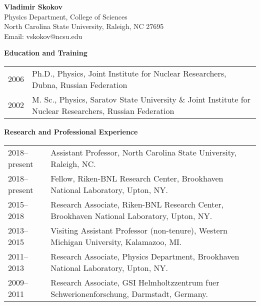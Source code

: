 
\begin{center}
   {\large\bf Vladimir Skokov} \\[0.25em]
    Physics Department, College of Sciences \\
    North Carolina State University, Raleigh, NC 27695 \\
    Email: vskokov@ncsu.edu
\end{center}

\noindent\textbf{Education and Training}

\vspace{0.6em}
\begin{tabular}{rp{5.6in}}
	2006 & Ph.D., Physics, Joint Institute for Nuclear Researchers, Dubna, Russian Federation \\[0.5em]
	2002 & M. Sc., Physics, Saratov State University \& Joint Institute for Nuclear Researchers, Russian Federation \\[0.5em]
\end{tabular}
\vspace{0.6em}
    
\noindent\textbf{Research and Professional Experience}

\vspace{0.6em}
\begin{tabular}{lp{5in}}
    {2018--present} & Assistant Professor, 
	North Carolina State University, 
	Raleigh, NC. \\[0.5em]
    {2018--present} & Fellow, 
	Riken-BNL Research Center, 
	Brookhaven National Laboratory, 
	Upton, NY. \\[0.5em]
    {2015--2018} & Research Associate, 
	Riken-BNL Research Center, 
	Brookhaven National Laboratory, 
	Upton, NY. \\[0.5em]
    {2013--2015} & Visiting Assistant Professor (non-tenure), 
	Western Michigan University, 
	Kalamazoo, MI.  \\[0.5em]
    {2011--2013} & Research Associate, 
	Physics Department, 
	Brookhaven National Laboratory, 
	Upton, NY. \\[0.5em]
    {2009--2011} & Research Associate, 
	GSI Helmholtzzentrum fuer Schwerionenforschung, 
	Darmstadt, Germany. \\[0.5em]
\end{tabular}

\vspace{0.6em}

